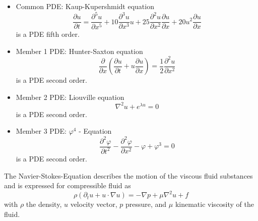 \newcommand{\assignmentDate}{October 28th, 2019}



\begin{itemize}
	\item Common PDE: Kaup-Kupershmidt equation
		\begin{equation}
			\frac{\partial u }{\partial t} = \frac{\partial ^5 u}{\partial x^5} + 10 \frac{\partial ^3 u}{\partial x^3} u + 25 \frac{\partial ^2 u}{\partial x^2} \frac{\partial u}{\partial x} + 20 u^2 \frac{\partial u}{\partial x}
		\end{equation}
		\hspace{2.4cm} is a PDE fifth order.
	
	\item Member 1 PDE: Hunter-Saxton equation
		\begin{equation}
			\frac{\partial}{\partial x} \left( \frac{\partial u }{\partial t} + u \frac{\partial u}{\partial x} \right) = \frac{1}{2} \frac{\partial ^2 u}{\partial x^2}
		\end{equation}
		\hspace{2.4cm} is a PDE second order.
	\item Member 2 PDE: Liouville equation
		\begin{equation}
			\nabla ^2 u + e ^{\lambda u} = 0
		\end{equation}
		\hspace{2.4cm} is a PDE second order.
	\item Member 3 PDE: $\varphi ^4$ - Equation
		\begin{equation}
			\frac{\partial ^2 \varphi}{\partial t ^2} - \frac{\partial ^2 \varphi}{\partial x ^2} - \varphi + \varphi ^3 = 0
		\end{equation}
		\hspace{2.4cm} is a PDE second order.
		
\end{itemize}
%
The Navier-Stokes-Equation describes the motion of the viscous fluid substances and is expressed for compressible fluid as
\begin{equation}
	\rho(\partial_t u + u \cdot \nabla u) = - \nabla p + \mu \nabla ^2 u + f
	\label{eq:NavStokes}
\end{equation}
with $\rho$ the density, $u$ velocity vector, $p$ pressure, and $\mu$ kinematic viscosity of the fluid.
